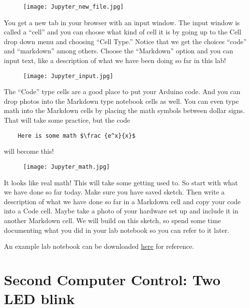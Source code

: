 \begin{figure}[h!]
	\centering
	\texttt{[image: Jupyter\_new\_file.jpg]}
\end{figure}

You get a new tab in your browser with an input window. The input window is called a ``cell'' and you can choose what kind of cell it is by going up to the Cell drop down menu and choosing ``Cell Type.'' Notice that we get the choices ``code'' and ``markdown'' among others. Choose the ``Markdown'' option and you can input text, like a description of what we have been doing so far in this lab!
  
\begin{figure}[h!]
	\centering
	\texttt{[image: Jupyter\_input.jpg]}
\end{figure}

The ``Code'' type cells are a good place to put your Arduino code.  And you can drop photos into the Markdown type notebook cells as well. You can even type math into the Markdown cells by placing the math symbols between dollar signs. That will take some practice, but the code 

\begin{verbatim}
	Here is some math $\frac {e^x}{x}$
\end{verbatim}

\noindent will become this!

\begin{figure}[h!]
	\centering
	\texttt{[image: Jupyter\_math.jpg]}
\end{figure}

\noindent It looks like real math! This will take some getting used to.  So start with what we have done so far today. Make sure you have saved sketch. Then write a description of what we have done so far in a Markdown cell and copy your code into a Code cell. Maybe take a photo of your hardware set up and include it in another Markdown cell. We will build on this sketch, so spend some time documenting what you did in your lab notebook so you can refer to it later.

An example lab notebook can be downloaded \href{https://raw.githubusercontent.com/rtlines/IntermediateLabPH250/main/Code/LAB3TEST.ipynb}{here} for reference.

\section{Second Computer Control: Two LED blink}

